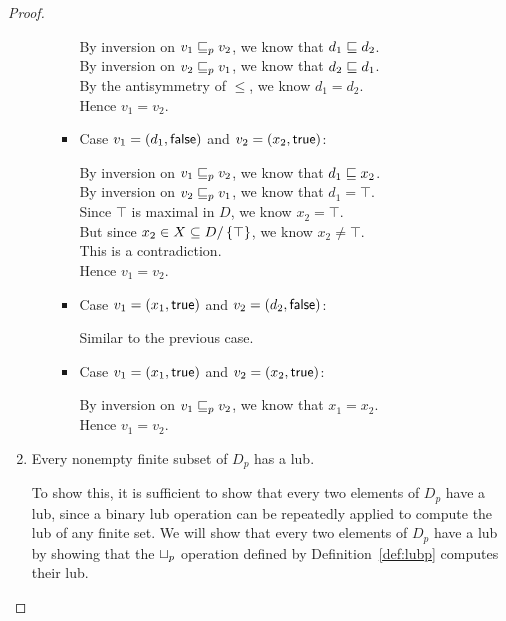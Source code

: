 \begin{proof}
\begin{enumerate}
\begin{enumerate}
\begin{itemize}
    By inversion on $v_1 \sqsubseteq_p v_2$, we know that $d_1 \sqsubseteq d_2$. \\ 
    By inversion on $v_2 \sqsubseteq_p v_1$, we know that $d_2 \sqsubseteq d_1$. \\ 
    By the antisymmetry of $\leq$, we know $d_1 = d_2$. \\ 
    Hence $v_1 = v_2$. 

  \item Case $v_1 = (d_1, \textsf{false})$ and $v_2 = (x_2, \textsf{true})$: 

    By inversion on $v_1 \sqsubseteq_p v_2$, we know that $d_1 \sqsubseteq x_2$. \\ 
    By inversion on $v_2 \sqsubseteq_p v_1$, we know that $d_1 = \top$. \\ 
    Since $\top$ is maximal in $D$, we know $x_2 = \top$. \\ 
    But since $x_2 \in X \subseteq D/\left\{\top\right\}$, we know $x_2 \not= \top$. \\ 
    This is a contradiction. \\
    Hence $v_1 = v_2$. 
    
  \item Case $v_1 = (x_1, \textsf{true})$ and $v_2 = (d_2, \textsf{false})$: 

    Similar to the previous case. 

  \item Case $v_1 = (x_1, \textsf{true})$ and $v_2 = (x_2, \textsf{true})$: 

    By inversion on $v_1 \sqsubseteq_p v_2$, we know that $x_1 = x_2$. \\
    Hence $v_1 = v_2$. 
  \end{itemize}
\end{enumerate}

\item Every nonempty finite subset of $D_p$ has a lub.

To show this, it is sufficient to show that every two elements of
$D_p$ have a lub, since a binary lub operation can be repeatedly
applied to compute the lub of any finite set.  We will show that every
two elements of $D_p$ have a lub by showing that the $ \sqcup_p $
operation defined by Definition~\ref{def:lubp} computes their lub.



\end{enumerate}
\end{proof}

